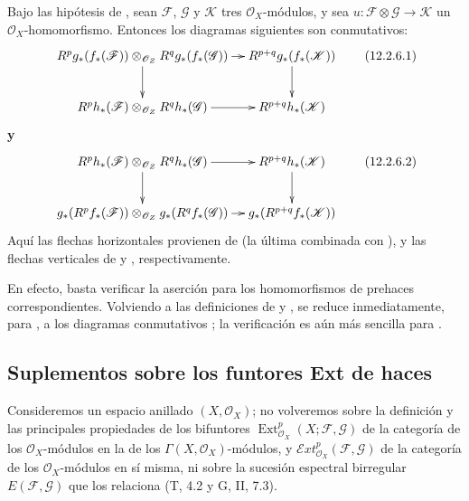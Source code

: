 \begin{env}[12.2.6]
\label{0.12.2.6}
\label{0.12.2.6-fr}
Bajo las hipótesis de , sean $\mathcal F$, $\mathcal G$
y $\mathcal K$ tres $\mathcal O_X$-módulos, y sea
$u:\mathcal F\otimes\mathcal G\to\mathcal K$
un $\mathcal O_X$-homomorfismo.
Entonces los diagramas siguientes son conmutativos:
\[
\xymatrix@C=10pt@R=24pt{
R^p g_*(f_*(\mathcal F))\otimes_{\mathcal O_Z}R^q g_*(f_*(\mathcal G))
\ar[r]\ar[d]&R^{p+q}g_*(f_*(\mathcal K))\ar[d]\\
R^p h_*(\mathcal F)\otimes_{\mathcal O_Z}R^q h_*(\mathcal G)
\ar[r]&R^{p+q}h_*(\mathcal K)
}
\tag{12.2.6.1}\label{0.12.2.6.1-fr}
\]
\textbf{y}
\[
\xymatrix@C=10pt@R=24pt{
R^p h_*(\mathcal F)\otimes_{\mathcal O_Z}R^q h_*(\mathcal G)
\ar[r]\ar[d]&R^{p+q}h_*(\mathcal K)\ar[d]\\
g_*(R^p f_*(\mathcal F))\otimes_{\mathcal O_Z}g_*(R^q f_*(\mathcal G))
\ar[r]&g_*(R^{p+q}f_*(\mathcal K))
}
\tag{12.2.6.2}\label{0.12.2.6.2-fr}
\]
Aquí las flechas horizontales provienen de  (la última
combinada con ), y las flechas
verticales de  y , respectivamente.

En efecto, basta verificar la aserción para los homomorfismos de prehaces
correspondientes.  Volviendo a las definiciones de
 y , se reduce inmediatamente, para
, a los diagramas conmutativos
; la verificación es aún más sencilla para
.
\end{env}

\subsection{Suplementos sobre los funtores Ext de haces}
\label{subsection:0.12.3}
\label{subsection:0.12.3-fr}

\begin{env}[12.3.1]
\label{0.12.3.1-fr}
Consideremos un espacio anillado $(X,\mathcal O_X)$; no volveremos sobre la definición y las principales propiedades de los bifuntores $\operatorname{Ext}_{\mathcal O_X}^p(X;\mathcal F,\mathcal G)$ de la categoría de los $\mathcal O_X$-módulos en la de los $\Gamma(X,\mathcal O_X)$-módulos, y $\mathcal{E}xt_{\mathcal O_X}^p(\mathcal F,\mathcal G)$ de la categoría de los $\mathcal O_X$-módulos en sí misma, ni sobre la sucesión espectral birregular $E(\mathcal F,\mathcal G)$ que los relaciona (T, 4.2 y G, II, 7.3).
\end{env}


